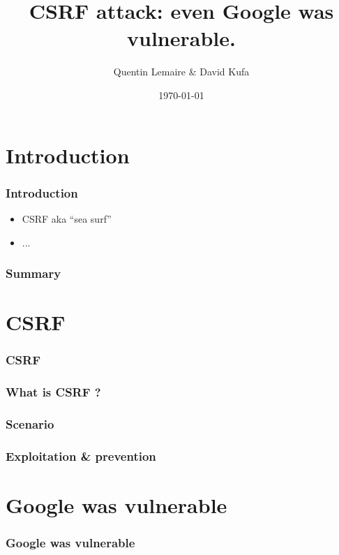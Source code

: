 \documentclass{beamer}
\title{CSRF attack: even Google was vulnerable.}
\author{Quentin Lemaire \& David Kufa}
\date{\today}
\begin{document}
  
\maketitle %

\section*{Introduction}
\begin{frame}
\frametitle{Introduction}
\begin{itemize}
 \item CSRF aka ``sea surf''
 \item ...
\end{itemize}

\end{frame}

\begin{frame}
  \frametitle{Summary}
  \tableofcontents
\end{frame}


\section{CSRF}
\begin{frame}
  \frametitle{CSRF}
  \tableofcontents[currentsection]
\end{frame}

\begin{frame}
  \frametitle{What is CSRF ?}
\end{frame}

\begin{frame}
  \frametitle{Scenario}
\end{frame}


\begin{frame}
  \frametitle{Exploitation \& prevention} %
\end{frame}




\section{Google was vulnerable}
\begin{frame}
  \frametitle{Google was vulnerable}
  \tableofcontents[currentsection]
\end{frame}
\end{document}
